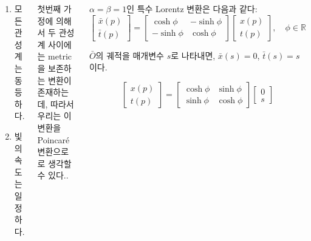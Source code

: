 \documentclass[25pt,portrait]{tikzposter}
\begin{document}
\begin{columns}
{    \begin{tcolorbox}[title=~~특수 상대성 이론에서의 가정~~\null]
    \begin{enumerate}
        \item 모든 관성계는 동등하다.
        \item 빛의 속도는 일정하다.
    \end{enumerate}
    \end{tcolorbox}
    첫번째 가정에 의해서 두 관성계 사이에는 metric을 보존하는 변환이 존재하는데, 따라서 우리는 이 변환을 Poincaré 변환으로로 생각할 수 있다..
    \begin{tcolorbox}[title=~~$O$가 보는 $\bar{O}$의 속력~~\null]
    $\alpha = \beta = 1$인 특수 Lorentz 변환은 다음과 같다:
    \[
        \begin{bmatrix}
            \bar{x}(p)\\\bar{t}(p)
        \end{bmatrix} = 
        \begin{bmatrix}
            \cosh{\phi} & -\sinh{\phi}\\
            -\sinh{\phi} & \cosh{\phi}
        \end{bmatrix}
        \begin{bmatrix}
            x(p) \\ t(p)
        \end{bmatrix}, \quad \phi \in \mathbb{R}
    \]
    
    $\bar{O}$의 궤적을 매개변수 $s$로 나타내면, $\bar{x}(s) = 0$, $\bar{t}(s) = s$이다.
    
     \[
        \begin{bmatrix}
            x(p) \\ t(p)
        \end{bmatrix} =
        \begin{bmatrix}
            \cosh{\phi} & \sinh{\phi}\\
            \sinh{\phi} & \cosh{\phi}
        \end{bmatrix}
        \begin{bmatrix}
            0 \\ s
        \end{bmatrix}
    \]
    

\end{tcolorbox}}
\end{columns}
\end{document}
